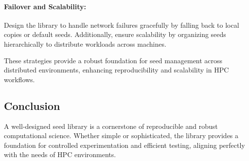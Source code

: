 \documentclass[12pt]{article}
\begin{document}
\paragraph{Failover and Scalability:} Design the library to handle network failures gracefully by falling back to local copies or default seeds. Additionally, ensure scalability by organizing seeds hierarchically to distribute workloads across machines.

These strategies provide a robust foundation for seed management across distributed environments, enhancing reproducibility and scalability in HPC workflows.

\subsection{Conclusion}

A well-designed seed library is a cornerstone of reproducible and robust computational science. Whether simple or sophisticated, the library provides a foundation for controlled experimentation and efficient testing, aligning perfectly with the needs of HPC environments.
\end{document}
